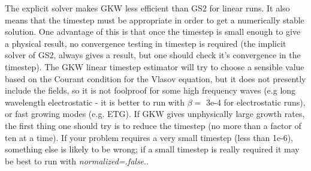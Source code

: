 \documentclass[a4paper,10pt]{article}
\newcommand{\name}[1]{\textsl{#1}} %
\begin{document}
The explicit solver makes GKW less efficient than GS2 for linear runs.  It also means that the timestep must be appropriate in order to get a numerically stable solution.  One advantage of this is that once the timestep is small enough to give a physical result, no convergence testing in timestep is required (the implicit solver of GS2, always gives a result, but one should check it's convergence in the timestep).  The GKW linear timestep estimator will try to choose a sensible value based on the Courant condition for the Vlasov equation, but it does not presently include the fields, so it is not foolproof for some high frequency waves (e.g long wavelength electrostatic - it is better to run with $\beta =$ 3e-4 for electrostatic runs), or fast growing modes (e.g. ETG).  If GKW gives unphysically large growth rates, the first thing one should try is to reduce the timestep (no more than a factor of ten at a time).  If your problem requires a very small timestep (less than 1e-6), something else is likely to be wrong; if a small timestep is really required it may be best to run with \name{normalized=.false}..
\end{document}
